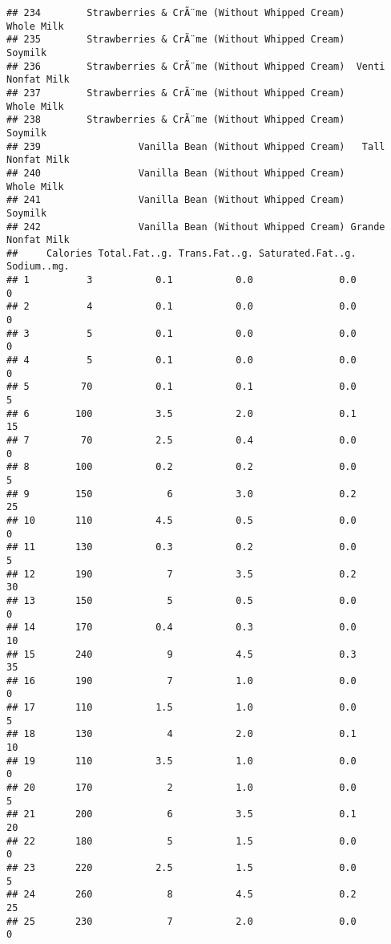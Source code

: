 \documentclass[
]{article}
\begin{document}
\begin{verbatim}
## 234        Strawberries & CrÃ¨me (Without Whipped Cream)         Whole Milk
## 235        Strawberries & CrÃ¨me (Without Whipped Cream)            Soymilk
## 236        Strawberries & CrÃ¨me (Without Whipped Cream)  Venti Nonfat Milk
## 237        Strawberries & CrÃ¨me (Without Whipped Cream)         Whole Milk
## 238        Strawberries & CrÃ¨me (Without Whipped Cream)            Soymilk
## 239                 Vanilla Bean (Without Whipped Cream)   Tall Nonfat Milk
## 240                 Vanilla Bean (Without Whipped Cream)         Whole Milk
## 241                 Vanilla Bean (Without Whipped Cream)            Soymilk
## 242                 Vanilla Bean (Without Whipped Cream) Grande Nonfat Milk
##     Calories Total.Fat..g. Trans.Fat..g. Saturated.Fat..g. Sodium..mg.
## 1          3           0.1           0.0               0.0           0
## 2          4           0.1           0.0               0.0           0
## 3          5           0.1           0.0               0.0           0
## 4          5           0.1           0.0               0.0           0
## 5         70           0.1           0.1               0.0           5
## 6        100           3.5           2.0               0.1          15
## 7         70           2.5           0.4               0.0           0
## 8        100           0.2           0.2               0.0           5
## 9        150             6           3.0               0.2          25
## 10       110           4.5           0.5               0.0           0
## 11       130           0.3           0.2               0.0           5
## 12       190             7           3.5               0.2          30
## 13       150             5           0.5               0.0           0
## 14       170           0.4           0.3               0.0          10
## 15       240             9           4.5               0.3          35
## 16       190             7           1.0               0.0           0
## 17       110           1.5           1.0               0.0           5
## 18       130             4           2.0               0.1          10
## 19       110           3.5           1.0               0.0           0
## 20       170             2           1.0               0.0           5
## 21       200             6           3.5               0.1          20
## 22       180             5           1.5               0.0           0
## 23       220           2.5           1.5               0.0           5
## 24       260             8           4.5               0.2          25
## 25       230             7           2.0               0.0           0

\end{verbatim}
\end{document}
